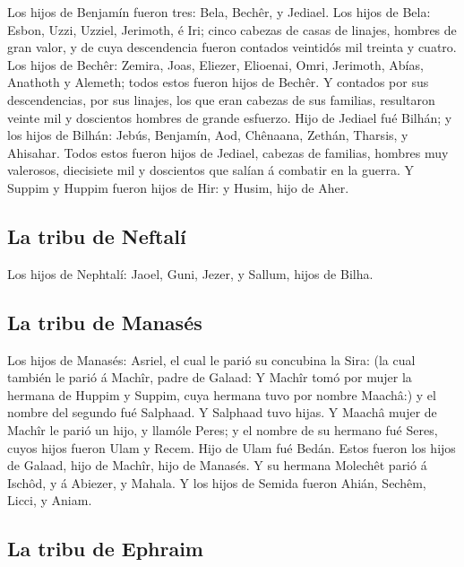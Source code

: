  Los hijos de Benjamín fueron tres: Bela, Bechêr, y
Jediael.  Los hijos de Bela: Esbon, Uzzi, Uzziel,
Jerimoth, é Iri; cinco cabezas de casas de linajes, hombres de gran
valor, y de cuya descendencia fueron contados veintidós mil treinta y
cuatro.  Los hijos de Bechêr: Zemira, Joas, Eliezer,
Elioenai, Omri, Jerimoth, Abías, Anathoth y Alemeth; todos estos fueron
hijos de Bechêr.  Y contados por sus descendencias, por
sus linajes, los que eran cabezas de sus familias, resultaron veinte mil
y doscientos hombres de grande esfuerzo.  Hijo de Jediael
fué Bilhán; y los hijos de Bilhán: Jebús, Benjamín, Aod, Chênaana,
Zethán, Tharsis, y Ahisahar.  Todos estos fueron hijos de
Jediael, cabezas de familias, hombres muy valerosos, diecisiete mil y
doscientos que salían á combatir en la guerra.  Y Suppim
y Huppim fueron hijos de Hir: y Husim, hijo de Aher.

\hypertarget{la-tribu-de-neftaluxed}{%
\subsection{La tribu de Neftalí}\label{la-tribu-de-neftaluxed}}

 Los hijos de Nephtalí: Jaoel, Guni, Jezer, y Sallum,
hijos de Bilha.

\hypertarget{la-tribu-de-manasuxe9s}{%
\subsection{La tribu de Manasés}\label{la-tribu-de-manasuxe9s}}

 Los hijos de Manasés: Asriel, el cual le parió su
concubina la Sira: (la cual también le parió á Machîr, padre de Galaad:
 Y Machîr tomó por mujer la hermana de Huppim y Suppim,
cuya hermana tuvo por nombre Maachâ:) y el nombre del segundo fué
Salphaad. Y Salphaad tuvo hijas.  Y Maachâ mujer de
Machîr le parió un hijo, y llamóle Peres; y el nombre de su hermano fué
Seres, cuyos hijos fueron Ulam y Recem.  Hijo de Ulam fué
Bedán. Estos fueron los hijos de Galaad, hijo de Machîr, hijo de
Manasés.  Y su hermana Molechêt parió á Ischôd, y á
Abiezer, y Mahala.  Y los hijos de Semida fueron Ahián,
Sechêm, Licci, y Aniam.

\hypertarget{la-tribu-de-ephraim}{%
\subsection{La tribu de Ephraim}\label{la-tribu-de-ephraim}}

